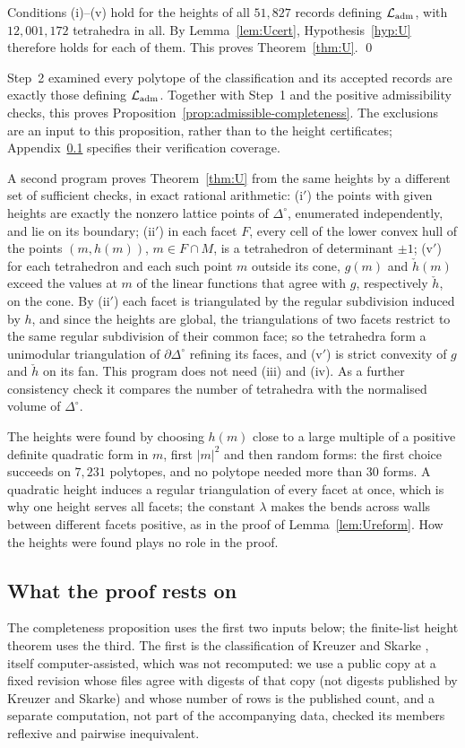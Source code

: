 Conditions (i)--(v) hold for the heights of all $51{,}827$ records defining $\mathcal L_{\rm adm}$, with $12{,}001{,}172$ tetrahedra in
all. By Lemma~\ref{lem:Ucert}, Hypothesis~\ref{hyp:U} therefore holds for each of them. This proves Theorem~\ref{thm:U}.
\qed

Step~2 examined every polytope of the classification and its accepted records are exactly those defining
$\mathcal L_{\rm adm}$. Together with Step~1 and the positive admissibility checks, this proves
Proposition~\ref{prop:admissible-completeness}. The exclusions are an input to this proposition, rather than to the
height certificates; Appendix~\ref{ssec:utrust} specifies their verification coverage.

A second program proves Theorem~\ref{thm:U} from the same heights by a different set of sufficient checks, in exact rational
arithmetic: (i$'$) the points with given heights are exactly the nonzero lattice points of $\Delta^\circ$, enumerated independently,
and lie on its boundary; (ii$'$) in each facet $F$, every cell of the lower convex hull of the points $(m,h(m))$,
$m\in F\cap M$, is a tetrahedron of determinant $\pm1$; (v$'$) for each tetrahedron and each such point $m$ outside its
cone, $g(m)$ and $\check h(m)$ exceed the values at $m$ of the linear functions that agree with $g$, respectively $\check h$,
on the cone. By (ii$'$) each facet is triangulated by the regular subdivision induced by $h$, and since the heights are
global, the triangulations of two facets restrict to the same regular subdivision of their common face; so the tetrahedra
form a unimodular triangulation of $\partial\Delta^\circ$ refining its faces, and (v$'$) is strict convexity of $g$ and
$\check h$ on its fan. This program does not need (iii) and (iv). As a further consistency check it compares the number of
tetrahedra with the normalised volume of $\Delta^\circ$.

The heights were found by choosing $h(m)$ close to a large multiple of a positive definite quadratic form in $m$, first
$|m|^2$ and then random forms: the first choice succeeds on $7{,}231$ polytopes, and no polytope needed more than $30$
forms. A quadratic height induces a regular triangulation of every facet at once, which is why one height serves all
facets; the constant $\lambda$ makes the bends across walls between different facets positive, as in the proof of
Lemma~\ref{lem:Ureform}. How the heights were found plays no role in the proof.

\subsection{What the proof rests on}\label{ssec:utrust}
The completeness proposition uses the first two inputs below; the finite-list height theorem uses the third. The first is the classification of Kreuzer and Skarke \cite{KS00}, itself computer-assisted, which was
not recomputed: we use a public copy at a fixed revision whose files agree with digests of that copy (not digests published
by Kreuzer and Skarke) and whose number of rows is the published count, and a separate computation, not part of the
accompanying data, checked its members reflexive and pairwise inequivalent.


